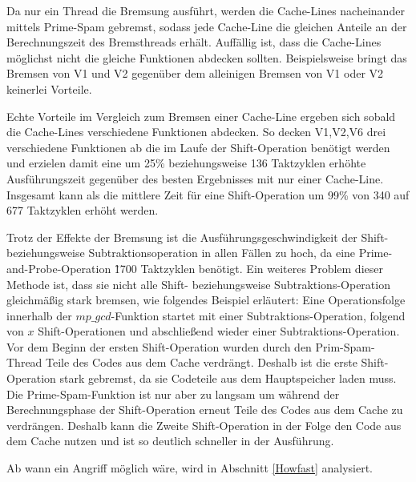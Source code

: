 Da nur ein Thread die Bremsung ausführt, werden die Cache-Lines nacheinander mittels Prime-Spam gebremst, sodass jede Cache-Line die gleichen Anteile an der Berechnungszeit des Bremsthreads erhält.
Auffällig ist, dass die Cache-Lines möglichst nicht die gleiche Funktionen abdecken sollten.
Beispielsweise bringt das Bremsen von V1 und V2 gegenüber dem alleinigen Bremsen von V1 oder V2 keinerlei Vorteile.

Echte Vorteile im Vergleich zum Bremsen einer Cache-Line ergeben sich sobald die Cache-Lines verschiedene Funktionen abdecken.
So decken V1,V2,V6 drei verschiedene Funktionen ab die im Laufe der Shift-Operation benötigt werden und erzielen damit eine um 25\% beziehungsweise 136 Taktzyklen erhöhte Ausführungszeit gegenüber des besten Ergebnisses mit nur einer Cache-Line.
Insgesamt kann als die mittlere Zeit für eine Shift-Operation um 99\% von 340 auf 677 Taktzyklen erhöht werden.

Trotz der Effekte der Bremsung ist die Ausführungsgeschwindigkeit der Shift- beziehungsweise Subtraktionsoperation in allen Fällen zu hoch, da eine Prime-and-Probe-Operation \~1700 Taktzyklen benötigt.
Ein weiteres Problem dieser Methode ist, dass sie nicht alle Shift- beziehungsweise Subtraktions-Operation gleichmäßig stark bremsen, wie folgendes Beispiel erläutert:
Eine Operationsfolge innerhalb der $mp\_gcd$-Funktion startet mit einer Subtraktions-Operation, folgend von $x$ Shift-Operationen und abschließend wieder einer Subtraktions-Operation.
Vor dem Beginn der ersten Shift-Operation wurden durch den Prim-Spam-Thread Teile des Codes aus dem Cache verdrängt.
Deshalb ist die erste Shift-Operation stark gebremst, da sie Codeteile aus dem Hauptspeicher laden muss. 
Die Prime-Spam-Funktion ist nur aber zu langsam um während der Berechnungsphase der Shift-Operation erneut Teile des Codes aus dem Cache zu verdrängen.
Deshalb kann die Zweite Shift-Operation in der Folge den Code aus dem Cache nutzen und ist so deutlich schneller in der Ausführung.

Ab wann ein Angriff möglich wäre, wird in Abschnitt \ref{Howfast} analysiert.






